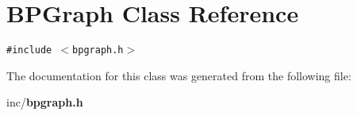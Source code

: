 \section{BPGraph Class Reference}
\label{classBPGraph}
{\tt \#include $<$bpgraph.h$>$}



The documentation for this class was generated from the following file:\begin{CompactItemize}
\item 
inc/{\bf bpgraph.h}\end{CompactItemize}
